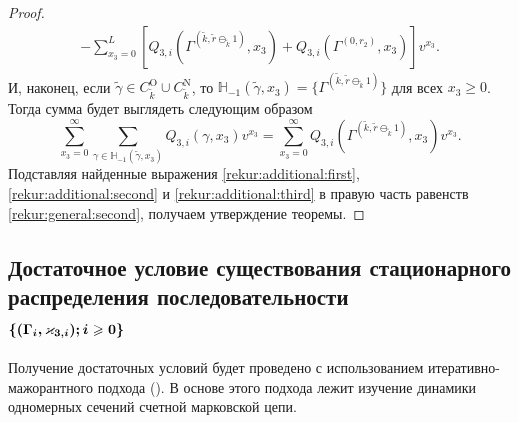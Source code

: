 \documentclass[a4paper,12pt,russian]{extarticle}
\newcommand{\MarkThree}{\{(\Gamma_i, \varkappa_{3,i}); \hm{} i \geqslant 0\}}
\begin{document}
\begin{proof}
\begin{multline}
-\sum_{x_3=0}^{L} \left[ Q_{3,i}(\Gamma^{(\tilde{k},\tilde{r}\ominus_{\tilde{k}} 1)},x_3) + Q_{3,i}(\Gamma^{(0,r_2)},x_3) \right] v^{x_3}.
\label{rekur:additional:second}
\end{multline}
И, наконец, если $\tilde{\gamma}\in C_{\tilde{k}}^{\mathrm{O}} \cup C_{\tilde{k}}^{\mathrm{N}}$, то ${\mathbb H}_{-1}(\tilde{\gamma},x_3) = \{\Gamma^{(\tilde{k},\tilde{r}\ominus_{\tilde{k}} 1)}\}$ для всех $x_3\geqslant 0$. Тогда сумма будет выглядеть следующим образом
\begin{equation}
\sum_{x_3=0}^{\infty} \sum_{\gamma \in {\mathbb H}_{-1}(\tilde{\gamma},x_3)} Q_{3,i}(\gamma,x_3) v^{x_3} = \sum_{x_3=0}^{\infty} Q_{3,i}(\Gamma^{(\tilde{k},\tilde{r}\ominus_{\tilde{k}} 1)},x_3) v^{x_3}.
\label{rekur:additional:third}
\end{equation}
Подставляя найденные выражения \eqref{rekur:additional:first}, \eqref{rekur:additional:second} и \eqref{rekur:additional:third} в правую часть равенств \eqref{rekur:general:second}, получаем утверждение теоремы.
\end{proof}

\subsection[Достаточное условие существования стационарного {распределения} последовательности\\ $\boldsymbol{\MarkThree}$]%
{ Достаточное условие существования стационарного {распределения} последовательности\\ $\boldsymbol{\MarkThree}$}
Получение достаточных условий будет проведено с использованием итеративно-мажорантного подхода (\cite{Fedotkin:1988,Fedotkin:1989}). В основе этого подхода лежит изучение динамики одномерных сечений счетной марковской цепи. 
\end{document}
